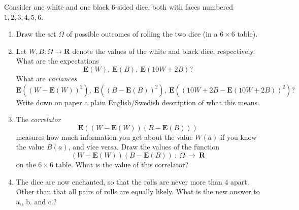 \documentclass[11pt,fleqn]{book} %
\begin{document}
\begin{problem}
Consider one white and one black 6-sided dice, both with faces numbered $1,2,3,4,5,6$. 
\begin{center}
 \end{center} 
\begin{enumerate}[label =\alph*.]
 \item Draw the set $\Omega$ of possible outcomes of rolling the two dice (in a $6 \times 6$ table).
 \item Let $W,B:\Omega \to \mathbf{R}$ denote the values of the white and black dice, respectively. What are the expectations
 $$\mathbf{E}(W), \ \mathbf{E}(B), \ \mathbf{E}(10 W + 2B)?$$
 What are \textit{variances} 
 $$\mathbf{E}((W-\mathbf{E}(W))^2), \ \mathbf{E}((B-\mathbf{E}(B))^2), \ \mathbf{E}((10 W + 2B - \mathbf{E}(10 W + 2B))^2)?$$
 Write down on paper a plain English/Swedish description of what this means.
 \item The \textit{correlator}
 $$\mathbf{E}\left( (W - \mathbf{E}(W))(B-\mathbf{E}(B))\right)$$
 measures how much information you get about the value $W(a)$ if you know the value $B(a)$, and vice versa. Draw the values of the function 
 $$(W - \mathbf{E}(W))(B-\mathbf{E}(B)) \ : \ \Omega \ \to \ \mathbf{R}$$
 on the $6\times 6$ table. What is the value of this correlator?
 \item The dice are now enchanted, so that the rolls are never more than $4$ apart. Other than that all pairs of rolls are equally likely. What is the new answer to a., b. and c.?
\end{enumerate}


 
\end{problem}
\end{document}
